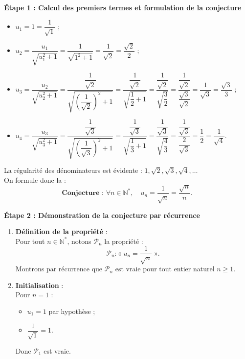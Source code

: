 \documentclass[11pt,a4paper]{article}
\newcommand{\N}{\mathbb{N}}
\begin{document}
\begin{correctionbox}
\textbf{Étape 1 : Calcul des premiers termes et formulation de la conjecture}
\begin{itemize}
    \item $u_1 = 1 = \dfrac{1}{\sqrt{1}}$ ;
    \item $u_2 = \dfrac{u_1}{\sqrt{u_1^2 + 1}} = \dfrac{1}{\sqrt{1^2 + 1}} = \dfrac{1}{\sqrt{2}} = \dfrac{\sqrt{2}}{2}$ ;
    \item $u_3 = \dfrac{u_2}{\sqrt{u_2^2 + 1}} = \dfrac{\dfrac{1}{\sqrt{2}}}{\sqrt{\left(\dfrac{1}{\sqrt{2}}\right)^2 + 1}} = \dfrac{\dfrac{1}{\sqrt{2}}}{\sqrt{\dfrac{1}{2} + 1}} = \dfrac{\dfrac{1}{\sqrt{2}}}{\sqrt{\dfrac{3}{2}}} = \dfrac{\dfrac{1}{\sqrt{2}}}{\dfrac{\sqrt{3}}{\sqrt{2}}} = \dfrac{1}{\sqrt{3}} = \dfrac{\sqrt{3}}{3}$ ;
    \item $u_4 = \dfrac{u_3}{\sqrt{u_3^2 + 1}} = \dfrac{\dfrac{1}{\sqrt{3}}}{\sqrt{\left(\dfrac{1}{\sqrt{3}}\right)^2 + 1}} = \dfrac{\dfrac{1}{\sqrt{3}}}{\sqrt{\dfrac{1}{3} + 1}} = \dfrac{\dfrac{1}{\sqrt{3}}}{\sqrt{\dfrac{4}{3}}} = \dfrac{\dfrac{1}{\sqrt{3}}}{\dfrac{2}{\sqrt{3}}} = \dfrac{1}{2} = \dfrac{1}{\sqrt{4}}$.
\end{itemize}
La régularité des dénominateurs est évidente : $1, \sqrt{2}, \sqrt{3}, \sqrt{4}, \dots$\\
On formule donc la :
\[
\textbf{Conjecture : } \forall n \in \N^*, \quad u_n = \frac{1}{\sqrt{n}} = \frac{\sqrt{n}}{n}.
\]

\textbf{Étape 2 : Démonstration de la conjecture par récurrence}
\begin{enumerate}[label=\textbf{\arabic*.}]
    \item \textbf{Définition de la propriété} :\\
    Pour tout $n \in \N^*$, notons $\mathcal{P}_n$ la propriété :
    \[
    \mathcal{P}_n : « \; u_n = \frac{1}{\sqrt{n}} \; ».
    \]
    Montrons par récurrence que $\mathcal{P}_n$ est vraie pour tout entier naturel $n \ge 1$.

    \item \textbf{Initialisation} :\\
    Pour $n = 1$ :
    \begin{itemize}
        \item $u_1 = 1$ par hypothèse ;
        \item $\dfrac{1}{\sqrt{1}} = 1$.
    \end{itemize}
    Donc $\mathcal{P}_1$ est vraie.


\end{enumerate}
\end{correctionbox}
\end{document}
